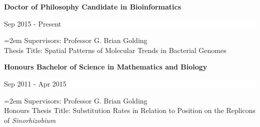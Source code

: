 \documentclass[paper=a4,fontsize=11pt]{scrartcl}	 			%
\newcommand{\sepspace}{\vspace*{1em}}			%
\newcommand{\EducationEntry}[4]{
		\noindent \textbf{#1} \hfill 					%
		\colorbox{White}{%
			\parbox{10em}{%
			\hfill\color{Black}#2}} \par				%
		\noindent \textit{#3} \par					%
		\noindent\hangindent=2em\hangafter=0 \small #4 	%
		\normalsize \par}
\newcommand{\EducationEntryB}[3]{
	\indent \textbf{#1} \hfill 					%
	\colorbox{White}{%
		\parbox{10em}{%
			\hfill\color{Black}#2}} \par	%
	\indent\hangindent=2em\hangafter=0 \small #3 	%
	\normalsize \par}
\begin{document}
\EducationEntryB{Doctor of Philosophy Candidate in Bioinformatics}{Sep 2015 - Present}{Supervisors: Professor G. Brian Golding\\
	Thesis Title: Spatial Patterns of Molecular Trends in Bacterial Genomes}
\EducationEntryB{Honours Bachelor of Science in Mathematics and Biology}{Sep 2011 - Apr 2015}{Supervisors: Professor G. Brian Golding\\
	Honours Thesis Title: Substitution Rates in Relation to Position on the Replicons of \textit{Sinorhizobium}}
%
%
\end{document}
